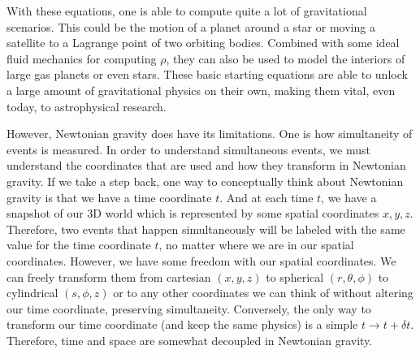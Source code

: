 \begin{bibunit}[unsrtnat]
With these equations, one is able to compute quite a lot of gravitational
scenarios. This could be the motion of a planet around a star or moving a
satellite to a Lagrange point of two orbiting bodies. Combined with some ideal
fluid mechanics for computing $\rho$, they can also be used to model the
interiors of large gas planets or even stars. These basic starting equations are
able to unlock a large amount of gravitational physics on their own, making them
vital, even today, to astrophysical research.

However, Newtonian gravity does have its limitations. One is how simultaneity
of events is measured. In order to understand simultaneous events, we must
understand the coordinates that are used and how they transform in Newtonian
gravity. If we take a step back, one way to conceptually think about Newtonian
gravity is that we have a time coordinate $t$. And at each time $t$, we have a
snapshot of our 3D world which is represented by some spatial coordinates
$x,y,z$. Therefore, two events that happen simultaneously will be labeled with
the same value for the time coordinate $t$, no matter where we are in our
spatial coordinates. However, we have some freedom with our spatial coordinates.
We can freely transform them from cartesian $(x,y,z)$ to spherical
$(r,\theta,\phi)$ to cylindrical $(s,\phi,z)$ or to any other coordinates we can
think of without altering our time coordinate, preserving simultaneity.
Conversely, the only way to transform our time coordinate (and keep the same
physics) is a simple $t\rightarrow t+\delta t$. Therefore, time and space are
somewhat decoupled in Newtonian gravity.


\end{bibunit}

